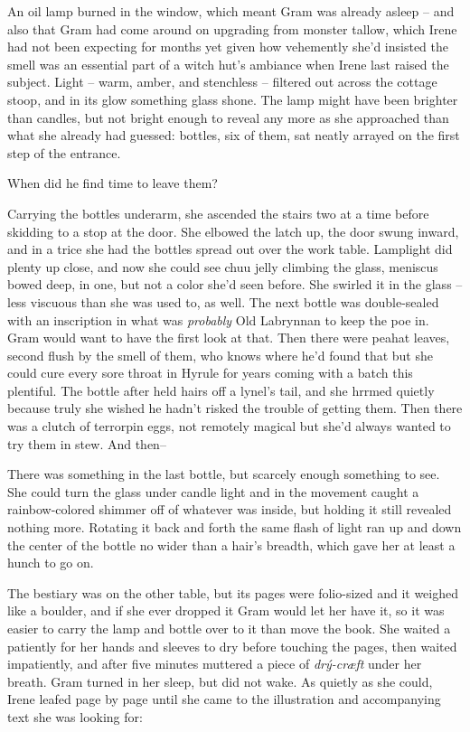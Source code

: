 \documentclass[../FGP.tex]{subfiles}
\begin{document}
An oil lamp burned in the window, which meant Gram was already asleep -- and also that Gram had come around on upgrading from monster tallow, which Irene had not been expecting for months yet given how vehemently she'd insisted the smell was an essential part of a witch hut's ambiance when Irene last raised the subject. Light -- warm, amber, and stenchless -- filtered out across the cottage stoop, and in its glow something glass shone. The lamp might have been brighter than candles, but not bright enough to reveal any more as she approached than what she already had guessed: bottles, six of them, sat neatly arrayed on the first step of the entrance. 

When did he find time to leave them?

Carrying the bottles underarm, she ascended the stairs two at a time before skidding to a stop at the door. She elbowed the latch up, the door swung inward, and in a trice she had the bottles spread out over the work table. Lamplight did plenty up close, and now she could see chuu jelly climbing the glass, meniscus bowed deep, in one, but not a color she'd seen before. She swirled it in the glass --less viscuous than she was used to, as well.  The next bottle was double-sealed with an inscription in what was \emph{probably} Old Labrynnan to keep the poe in. Gram would want to have the first look at that. Then there were peahat leaves, second flush by the smell of them, who knows where he'd found that but she could cure every sore throat in Hyrule for years coming with a batch this plentiful. The bottle after held hairs off a lynel's tail, and she hrrmed quietly because truly she wished he hadn't risked the trouble of getting them. Then there was a clutch of terrorpin eggs, not remotely magical but she'd always wanted to try them in stew. And then--

There was something in the last bottle, but scarcely enough something to see. She could turn the glass under candle light and in the movement caught a rainbow-colored shimmer off of whatever was inside, but holding it still revealed nothing more. Rotating it back and forth the same flash of light ran up and down the center of the bottle no wider than a hair's breadth, which gave her at least a hunch to go on. 

The bestiary was on the other table, but its pages were folio-sized and it weighed like a boulder, and if she ever dropped it Gram would let her have it, so it was easier to carry the lamp and bottle over to it than move the book. She waited a patiently for her hands and sleeves to dry before touching the pages, then waited impatiently, and after five minutes muttered a piece of \emph{drý-cræft}%
under her breath. Gram turned in her sleep, but did not wake. As quietly as she could, Irene leafed page by page until she came to the illustration and accompanying text she was looking for:
\end{document}
